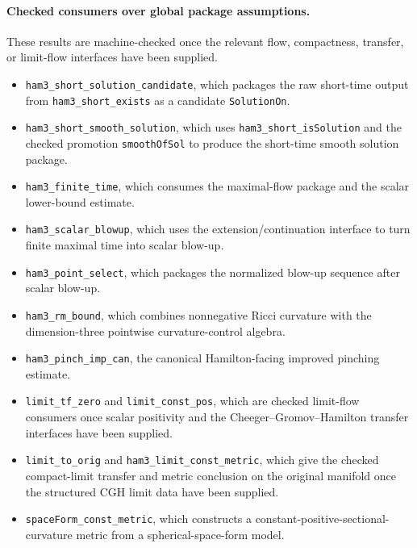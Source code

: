 \documentclass[11pt]{article}
\theoremstyle{plain}
\theoremstyle{definition}
\theoremstyle{remark}
\newcommand{\leanref}[1]{\nolinkurl{#1}}
\begin{document}
\paragraph{Checked consumers over global package assumptions.}
These results are machine-checked once the relevant flow, compactness, transfer,
or limit-flow interfaces have been supplied.
\begin{itemize}[leftmargin=2em]
  \item \leanref{ham3_short_solution_candidate}, which packages the raw
  short-time output from \leanref{ham3_short_exists} as a candidate
  \leanref{SolutionOn}.
  \item \leanref{ham3_short_smooth_solution}, which uses
  \leanref{ham3_short_isSolution} and the checked promotion
  \leanref{smoothOfSol} to produce the short-time smooth solution package.
  \item \leanref{ham3_finite_time}, which consumes the maximal-flow package and
  the scalar lower-bound estimate.
  \item \leanref{ham3_scalar_blowup}, which uses the extension/continuation
  interface to turn finite maximal time into scalar blow-up.
  \item \leanref{ham3_point_select}, which packages the normalized blow-up
  sequence after scalar blow-up.
  \item \leanref{ham3_rm_bound}, which combines nonnegative Ricci curvature
  with the dimension-three pointwise curvature-control algebra.
  \item \leanref{ham3_pinch_imp_can}, the canonical Hamilton-facing improved
  pinching estimate.
  \item \leanref{limit_tf_zero} and \leanref{limit_const_pos}, which are checked
  limit-flow consumers once scalar positivity and the Cheeger--Gromov--Hamilton
  transfer interfaces have been supplied.
  \item \leanref{limit_to_orig} and \leanref{ham3_limit_const_metric}, which
  give the checked compact-limit transfer and metric conclusion on the original
  manifold once the structured CGH limit data have been supplied.
  \item \leanref{spaceForm_const_metric}, which constructs a
  constant-positive-sectional-curvature metric from a spherical-space-form
  model.
\end{itemize}
\end{document}
